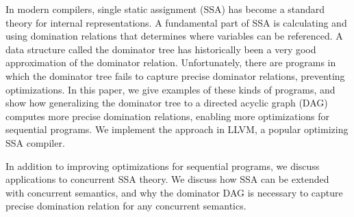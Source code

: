 In modern compilers, single static assignment (SSA) has become a standard theory
for internal representations. A fundamental part of SSA is calculating and using
domination relations that determines where variables can be referenced.  A data
structure called the dominator tree has historically been a very good
approximation of the dominator relation. Unfortunately, there are programs in
which the dominator tree fails to capture precise dominator relations,
preventing optimizations. In this paper, we give examples of these kinds of
programs, and show how generalizing the dominator tree to a directed acyclic
graph (DAG) computes more precise domination relations, enabling more
optimizations for sequential programs. We implement the approach in LLVM, a
popular optimizing SSA compiler.  

In addition to improving optimizations for sequential programs, we discuss
applications to concurrent SSA theory. We discuss how SSA can be extended with
concurrent semantics, and why the dominator DAG is necessary to capture precise
domination relation for any concurrent semantics. 

